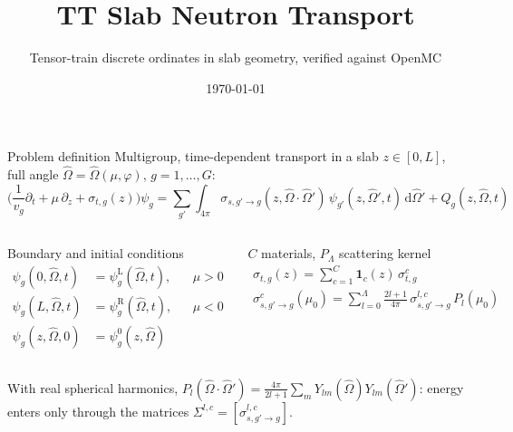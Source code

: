 \documentclass[aspectratio=169,11pt]{beamer}
\title{TT Slab Neutron Transport}
\subtitle{Tensor-train discrete ordinates in slab geometry, verified against OpenMC}
\author{}   %
\institute{}
\date{\today}
\newcommand{\Om}{\hat{\Omega}}
\newcommand{\dd}{\mathrm{d}}
\begin{document}
\maketitle

\begin{frame}{Problem definition}
\small
Multigroup, time-dependent transport in a slab $z\in[0,L]$, full angle $\Om=\Om(\mu,\varphi)$, $g=1,\dots,G$:
\begin{equation*}
\Big(\frac{1}{v_g}\partial_t+\mu\,\partial_z+\sigma_{t,g}(z)\Big)\psi_g
=\sum_{g'}\int_{4\pi}\sigma_{s,g'\to g}(z,\Om\cdot\Om')\,\psi_{g'}(z,\Om',t)\,\dd\Om'+Q_g(z,\Om,t)
\end{equation*}
\vspace{-1ex}
\begin{columns}[T,onlytextwidth]
\begin{block}{Boundary and initial conditions}
\vspace{-2ex}
\begin{align*}
\psi_g(0,\Om,t)&=\psi^{\mathrm L}_g(\Om,t), && \mu>0\\[-2pt]
\psi_g(L,\Om,t)&=\psi^{\mathrm R}_g(\Om,t), && \mu<0\\[-2pt]
\psi_g(z,\Om,0)&=\psi^{0}_g(z,\Om)
\end{align*}
\end{block}
\begin{block}{$C$ materials, $P_\Lambda$ scattering kernel}
\vspace{-2ex}
\begin{gather*}
\sigma_{t,g}(z)=\textstyle\sum_{c=1}^{C}\mathbf 1_c(z)\,\sigma^c_{t,g}\\[-2pt]
\sigma^c_{s,g'\to g}(\mu_0)=\sum_{l=0}^{\Lambda}\frac{2l+1}{4\pi}\,\sigma^{l,c}_{s,g'\to g}\,P_l(\mu_0)
\end{gather*}
\end{block}
\end{columns}
\vspace{1ex}
{\footnotesize With real spherical harmonics, $P_l(\Om\cdot\Om')=\frac{4\pi}{2l+1}\sum_m Y_{lm}(\Om)Y_{lm}(\Om')$: energy enters only through the matrices $\Sigma^{l,c}=[\sigma^{l,c}_{s,g'\to g}]$.}
\end{frame}

\end{document}
